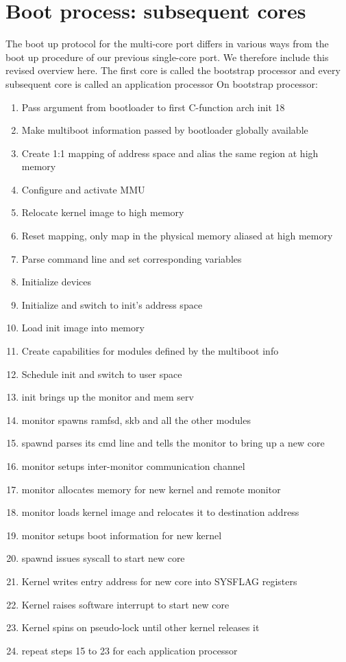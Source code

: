 \documentclass[a4paper,twoside]{report} %
\begin{document}
\section{Boot process: subsequent cores}


The boot up protocol for the multi-core port differs in various ways
from the boot up procedure of our previous single-core port. We
therefore include this revised overview here. The first core is called
the bootstrap processor and every subsequent core is called an
application processor On bootstrap processor:

\begin{enumerate}
\item Pass argument from bootloader to first C-function arch
  init 18
\item Make multiboot information passed by bootloader globally
  available
\item Create 1:1 mapping of address space and alias the same region at
  high memory
\item Configure and activate MMU
\item Relocate kernel image to high memory
\item Reset mapping, only map in the physical memory aliased at high
  memory
\item Parse command line and set corresponding variables
\item Initialize devices
\item Initialize and switch to init’s address space
\item Load init image into memory
\item Create capabilities for modules defined by the multiboot info
\item Schedule init and switch to user space
\item init brings up the monitor and mem serv
\item monitor spawns ramfsd, skb and all the other modules
\item spawnd parses its cmd line and tells the monitor to bring up a
  new core
\item monitor setups inter-monitor communication channel
\item monitor allocates memory for new kernel and remote monitor
\item monitor loads kernel image and relocates it to destination
  address
\item monitor setups boot information for new kernel
\item spawnd issues syscall to start new core
\item Kernel writes entry address for new core into SYSFLAG registers
\item Kernel raises software interrupt to start new core
\item Kernel spins on pseudo-lock until other kernel releases it
\item repeat steps 15 to 23 for each application processor
\end{enumerate}
\end{document}
